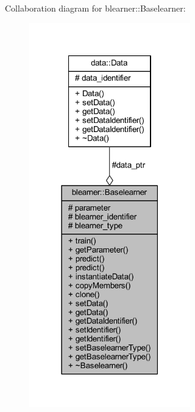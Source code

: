 Collaboration diagram for blearner\+:\+:Baselearner\+:\nopagebreak
\begin{figure}[H]
\begin{center}
\leavevmode
\includegraphics[width=198pt]{classblearner_1_1_baselearner__coll__graph}
\end{center}
\end{figure}

